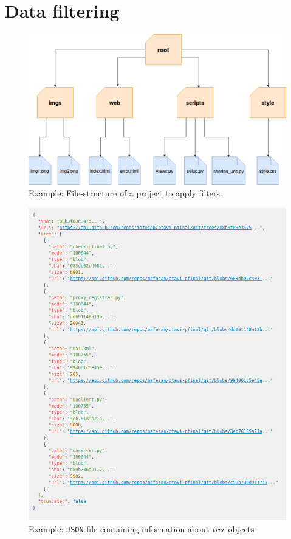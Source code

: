 \documentclass[a4paper, 12pt]{book}
\begin{document}
\section{Data filtering}
\label{sec:data-filtering}
\begin{figure}
  \centering
  \includegraphics[width=13cm, keepaspectratio]{img/file-structure-example}
  \caption{Example: File-structure of a project to apply filters.}
  \label{fig:file-structure-example}
\end{figure}
\begin{figure}
  \centering
  \includegraphics[width=13cm, keepaspectratio]{img/gh-api-trees-json-example}
  \caption{Example: \texttt{JSON} file containing information about \textit{tree} objects}
  \label{fig:gh-tree-json}
\end{figure}
\end{document}
